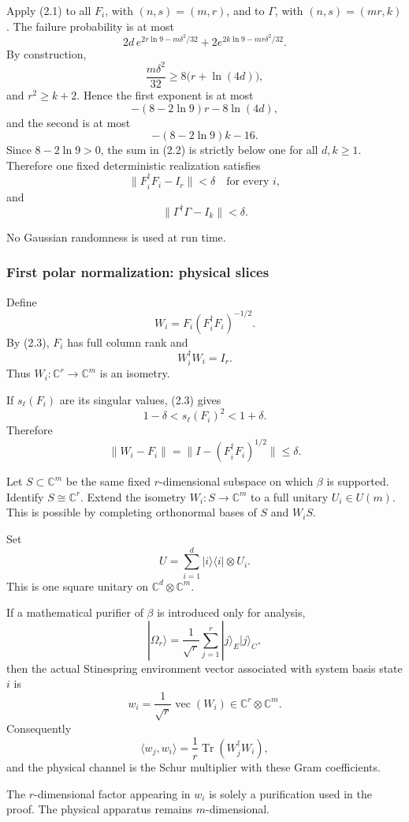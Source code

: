 \documentclass[11pt,a4paper]{article}
\numberwithin{equation}{section}
\begin{document}
Apply (2.1) to all \(F_i\), with \((n,s)=(m,r)\), and to \(\Gamma\),
with \((n,s)=(mr,k)\). The failure probability is at most \[
2d\,e^{2r\ln9-m\delta^2/32}
+
2e^{2k\ln9-mr\delta^2/32}.
\tag{2.2}
\] By construction, \[
\frac{m\delta^2}{32}
\ge8\bigl(r+\ln(4d)\bigr),
\] and \(r^2\ge k+2\). Hence the first exponent is at most \[
-(8-2\ln9)r-8\ln(4d),
\] and the second is at most \[
-(8-2\ln9)k-16.
\] Since \(8-2\ln9>0\), the sum in (2.2) is strictly below one for all
\(d,k\ge1\). Therefore one fixed deterministic realization satisfies \[
\|F_i^\dagger F_i-I_r\|<\delta
\quad\text{for every }i,
\tag{2.3}
\] and \[
\|\Gamma^\dagger\Gamma-I_k\|<\delta.
\tag{2.4}
\]

No Gaussian randomness is used at run time.

\subsubsection{First polar normalization: physical
slices}\label{first-polar-normalization-physical-slices}

Define \[
W_i=F_i(F_i^\dagger F_i)^{-1/2}.
\] By (2.3), \(F_i\) has full column rank and \[
W_i^\dagger W_i=I_r.
\] Thus \(W_i:\mathbb C^r\to\mathbb C^m\) is an isometry.

If \(s_\ell(F_i)\) are its singular values, (2.3) gives \[
1-\delta<s_\ell(F_i)^2<1+\delta.
\] Therefore \[
\|W_i-F_i\|
=
\|I-(F_i^\dagger F_i)^{1/2}\|
\le\delta.
\tag{2.5}
\]

Let \(S\subset\mathbb C^m\) be the same fixed \(r\)-dimensional subspace
on which \(\beta\) is supported. Identify \(S\cong\mathbb C^r\). Extend
the isometry \(W_i:S\to\mathbb C^m\) to a full unitary \(U_i\in U(m)\).
This is possible by completing orthonormal bases of \(S\) and \(W_iS\).

Set \[
U=\sum_{i=1}^d |i\rangle\langle i|\otimes U_i.
\] This is one square unitary on \(\mathbb C^d\otimes\mathbb C^m\).

If a mathematical purifier of \(\beta\) is introduced only for analysis,
\[
|\Omega_r\rangle
=
\frac1{\sqrt r}\sum_{j=1}^r|j\rangle_E|j\rangle_C,
\] then the actual Stinespring environment vector associated with system
basis state \(i\) is \[
w_i
=
\frac1{\sqrt r}\operatorname{vec}(W_i)
\in\mathbb C^r\otimes\mathbb C^m.
\] Consequently \[
\langle w_j,w_i\rangle
=
\frac1r\operatorname{Tr}(W_j^\dagger W_i),
\] and the physical channel is the Schur multiplier with these Gram
coefficients.

The \(r\)-dimensional factor appearing in \(w_i\) is solely a
purification used in the proof. The physical apparatus remains
\(m\)-dimensional.
\end{document}
